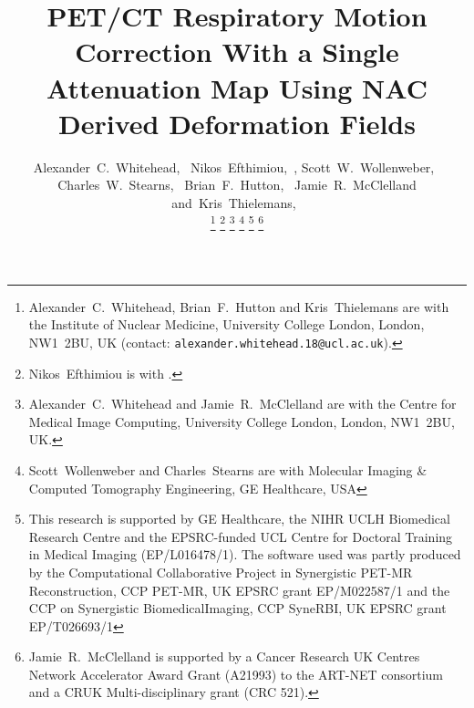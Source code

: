 \documentclass[10pt, twocolumn, twoside, letterpaper]{IEEEtran}
\begin{document}
\title{PET/CT Respiratory Motion Correction With a Single Attenuation Map Using NAC Derived Deformation Fields }

\pagestyle{plain}

\author{Alexander~C.~Whitehead,~
        Nikos~Efthimiou,~,
        Scott~W.~Wollenweber,~
        Charles~W.~Stearns,~
        Brian~F.~Hutton,~
        Jamie~R.~McClelland
        and~Kris~Thielemans,~%

    \thanks{Alexander~C.~Whitehead, Brian~F.~Hutton and Kris~Thielemans are with the Institute of Nuclear Medicine, University College London, London, NW1~2BU, UK (contact: \texttt{alexander.whitehead.18@ucl.ac.uk}).}%
    \thanks{Nikos~Efthimiou is with .}%
    \thanks{Alexander~C.~Whitehead and Jamie~R.~McClelland are with the Centre for Medical Image Computing, University College London, London, NW1~2BU, UK.}%
    \thanks{Scott~Wollenweber and Charles~Stearns are with Molecular Imaging \& Computed Tomography Engineering, GE Healthcare, USA}%
    \thanks{This research is supported by GE Healthcare, the NIHR UCLH Biomedical Research Centre and the EPSRC-funded UCL Centre for Doctoral Training in Medical Imaging (EP/L016478/1). The software used was partly produced by the Computational Collaborative Project in Synergistic PET-MR Reconstruction, CCP PET-MR, UK EPSRC grant EP/M022587/1 and
    the CCP on Synergistic BiomedicalImaging, CCP SyneRBI, UK EPSRC grant EP/T026693/1}%
    \thanks{Jamie~R.~McClelland is supported by a Cancer Research UK Centres Network Accelerator Award Grant (A21993) to the ART-NET consortium and a CRUK Multi-disciplinary grant (CRC 521).}%
}

\maketitle
\IEEEpeerreviewmaketitle
\end{document}
